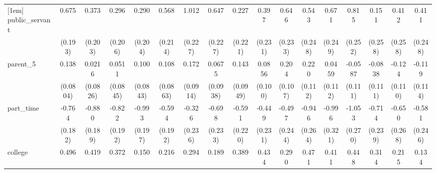 {\begin{tabular}{l*{16}{c}}
[1em]
public\_servant      &       0.675\sym{***}&       0.373         &       0.296         &       0.290         &       0.568\sym{**} &       1.012\sym{***}&       0.647\sym{**} &       0.227         &       0.397         &       0.646\sym{**} &       0.543\sym{*}  &       0.671\sym{**} &       0.815\sym{**} &       0.151         &       0.412         &       0.411         \\
                    &     (0.193)         &     (0.203)         &     (0.206)         &     (0.204)         &     (0.214)         &     (0.227)         &     (0.227)         &     (0.221)         &     (0.231)         &     (0.233)         &     (0.248)         &     (0.249)         &     (0.252)         &     (0.258)         &     (0.258)         &     (0.248)         \\
[1em]
parent\_5            &       0.138         &      0.0216         &      0.0511         &       0.100         &       0.108         &       0.172         &      0.0675         &       0.143         &      0.0856         &       0.204         &       0.220\sym{*}  &      0.0459         &     -0.0587         &     -0.0838         &      -0.124         &      -0.119         \\
                    &    (0.0804)         &    (0.0826)         &    (0.0845)         &    (0.0843)         &    (0.0863)         &    (0.0914)         &    (0.0938)         &    (0.0949)         &     (0.100)         &     (0.107)         &     (0.112)         &     (0.112)         &     (0.111)         &     (0.111)         &     (0.110)         &     (0.114)         \\
[1em]
part\_time           &      -0.764\sym{***}&      -0.880\sym{***}&      -0.822\sym{***}&      -0.993\sym{***}&      -0.594\sym{**} &      -0.326         &      -0.698\sym{**} &      -0.591\sym{**} &      -0.449         &      -0.497\sym{*}  &      -0.946\sym{***}&      -0.996\sym{**} &      -1.053\sym{***}&      -0.714\sym{**} &      -0.650\sym{*}  &      -0.581\sym{*}  \\
                    &     (0.182)         &     (0.189)         &     (0.192)         &     (0.197)         &     (0.192)         &     (0.236)         &     (0.233)         &     (0.220)         &     (0.231)         &     (0.244)         &     (0.264)         &     (0.321)         &     (0.270)         &     (0.239)         &     (0.268)         &     (0.246)         \\
[1em]
college             &       0.496\sym{***}&       0.419\sym{***}&       0.372\sym{***}&       0.150         &       0.216         &       0.294\sym{*}  &       0.189         &       0.389\sym{**} &       0.434\sym{**} &       0.290\sym{*}  &       0.471\sym{**} &       0.411\sym{**} &       0.448\sym{**} &       0.314\sym{*}  &       0.215         &       0.134         \\

\end{tabular}}
